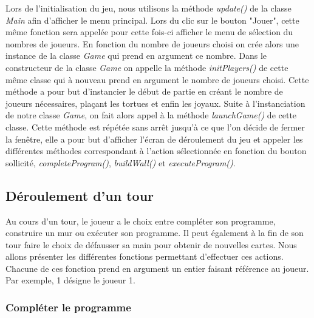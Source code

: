 \documentclass{article}
\begin{document}
Lors de l'initialisation du jeu, nous utilisons la méthode \textit{update()} de la classe \textit{Main} afin d'afficher le menu principal. Lors du clic sur le bouton "Jouer", cette même fonction sera appelée pour cette fois-ci afficher le menu de sélection du nombres de joueurs. En fonction du nombre de joueurs choisi on crée alors une instance de la classe \textit{Game} qui prend en argument ce nombre. Dans le constructeur de la classe \textit{Game} on appelle la méthode \textit{initPlayers()} de cette même classe qui à nouveau prend en argument le nombre de joueurs choisi. Cette méthode a pour but d'instancier le début de partie en créant le nombre de joueurs nécessaires, plaçant les tortues et enfin les joyaux. Suite à l'instanciation de notre classe \textit{Game}, on fait alors appel à la méthode \textit{launchGame()} de cette classe. Cette méthode est répétée sans arrêt jusqu'à ce que l'on décide de fermer la fenêtre, elle a pour but d'afficher l'écran de déroulement du jeu et appeler les différentes méthodes correspondant à l'action sélectionnée en fonction du bouton sollicité, \textit{completeProgram()}, \textit{buildWall()} et \textit{executeProgram()}.

	\subsection{Déroulement d'un tour}
\indent Au cours d'un tour, le joueur a le choix entre compléter son programme, construire un mur ou exécuter son programme. Il peut également à la fin de son tour faire le choix de défausser sa main pour obtenir de nouvelles cartes. Nous allons présenter les différentes fonctions permettant d'effectuer ces actions. Chacune de ces fonction prend en argument un entier faisant référence au joueur. Par exemple, 1 désigne le joueur 1.

\newpage

		\subsubsection{Compléter le programme}
		
\end{document}
